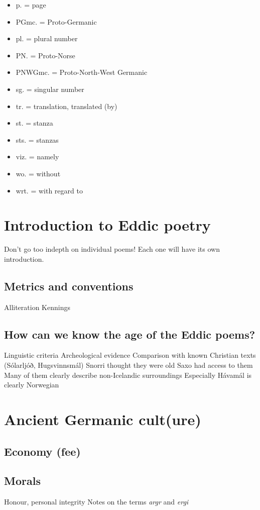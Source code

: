 \begin{itemize}
    \item p. = page
    \item PGmc. = Proto-Germanic
    \item pl. = plural number
    \item PN. = Proto-Norse
    \item PNWGmc. = Proto-North-West Germanic
    \item sg. = singular number
    \item tr. = translation, translated (by)
    \item st. = stanza
    \item sts. = stanzas
    \item viz. = namely
    \item wo. = without
    \item wrt. = with regard to
  \end{itemize}

\newpage


\section{Introduction to Eddic poetry}
  Don't go too indepth on individual poems! Each one will have its own introduction.
  \subsection{Metrics and conventions}
    Alliteration
    Kennings
  \subsection{How can we know the age of the Eddic poems?}
    Linguistic criteria
    Archeological evidence
    Comparison with known Christian texts (Sólarljóð, Hugsvinnsmál)
    Snorri thought they were old
    Saxo had access to them
    Many of them clearly describe non-Icelandic surroundings
      Especially Hávamál is clearly Norwegian

\section{Ancient Germanic cult(ure)}
  \subsection{Economy (fee)}
  \subsection{Morals}
    Honour, personal integrity
    Notes on the terms \emph{argr} and \emph{ergi}

